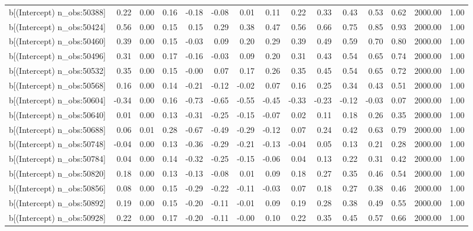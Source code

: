 \begin{table}[ht]
\begin{tabular}{rrrrrrrrrrrrrrr}
  b[(Intercept) n\_obs:50388] & 0.22 & 0.00 & 0.16 & -0.18 & -0.08 & 0.01 & 0.11 & 0.22 & 0.33 & 0.43 & 0.53 & 0.62 & 2000.00 & 1.00 \\ 
  b[(Intercept) n\_obs:50424] & 0.56 & 0.00 & 0.15 & 0.15 & 0.29 & 0.38 & 0.47 & 0.56 & 0.66 & 0.75 & 0.85 & 0.93 & 2000.00 & 1.00 \\ 
  b[(Intercept) n\_obs:50460] & 0.39 & 0.00 & 0.15 & -0.03 & 0.09 & 0.20 & 0.29 & 0.39 & 0.49 & 0.59 & 0.70 & 0.80 & 2000.00 & 1.00 \\ 
  b[(Intercept) n\_obs:50496] & 0.31 & 0.00 & 0.17 & -0.16 & -0.03 & 0.09 & 0.20 & 0.31 & 0.43 & 0.54 & 0.65 & 0.74 & 2000.00 & 1.00 \\ 
  b[(Intercept) n\_obs:50532] & 0.35 & 0.00 & 0.15 & -0.00 & 0.07 & 0.17 & 0.26 & 0.35 & 0.45 & 0.54 & 0.65 & 0.72 & 2000.00 & 1.00 \\ 
  b[(Intercept) n\_obs:50568] & 0.16 & 0.00 & 0.14 & -0.21 & -0.12 & -0.02 & 0.07 & 0.16 & 0.25 & 0.34 & 0.43 & 0.51 & 2000.00 & 1.00 \\ 
  b[(Intercept) n\_obs:50604] & -0.34 & 0.00 & 0.16 & -0.73 & -0.65 & -0.55 & -0.45 & -0.33 & -0.23 & -0.12 & -0.03 & 0.07 & 2000.00 & 1.00 \\ 
  b[(Intercept) n\_obs:50640] & 0.01 & 0.00 & 0.13 & -0.31 & -0.25 & -0.15 & -0.07 & 0.02 & 0.11 & 0.18 & 0.26 & 0.35 & 2000.00 & 1.00 \\ 
  b[(Intercept) n\_obs:50688] & 0.06 & 0.01 & 0.28 & -0.67 & -0.49 & -0.29 & -0.12 & 0.07 & 0.24 & 0.42 & 0.63 & 0.79 & 2000.00 & 1.00 \\ 
  b[(Intercept) n\_obs:50748] & -0.04 & 0.00 & 0.13 & -0.36 & -0.29 & -0.21 & -0.13 & -0.04 & 0.05 & 0.13 & 0.21 & 0.28 & 2000.00 & 1.00 \\ 
  b[(Intercept) n\_obs:50784] & 0.04 & 0.00 & 0.14 & -0.32 & -0.25 & -0.15 & -0.06 & 0.04 & 0.13 & 0.22 & 0.31 & 0.42 & 2000.00 & 1.00 \\ 
  b[(Intercept) n\_obs:50820] & 0.18 & 0.00 & 0.13 & -0.13 & -0.08 & 0.01 & 0.09 & 0.18 & 0.27 & 0.35 & 0.46 & 0.54 & 2000.00 & 1.00 \\ 
  b[(Intercept) n\_obs:50856] & 0.08 & 0.00 & 0.15 & -0.29 & -0.22 & -0.11 & -0.03 & 0.07 & 0.18 & 0.27 & 0.38 & 0.46 & 2000.00 & 1.00 \\ 
  b[(Intercept) n\_obs:50892] & 0.19 & 0.00 & 0.15 & -0.20 & -0.11 & -0.01 & 0.09 & 0.19 & 0.28 & 0.38 & 0.49 & 0.55 & 2000.00 & 1.00 \\ 
  b[(Intercept) n\_obs:50928] & 0.22 & 0.00 & 0.17 & -0.20 & -0.11 & -0.00 & 0.10 & 0.22 & 0.35 & 0.45 & 0.57 & 0.66 & 2000.00 & 1.00 \\ 

\end{tabular}
\end{table}
